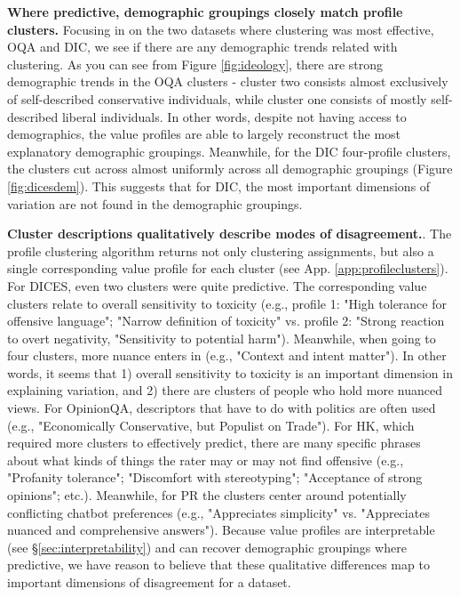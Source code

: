 \documentclass[11pt]{article}
\begin{document}
\textbf{Where predictive, demographic groupings closely match profile clusters.}
Focusing in on the two datasets where clustering was most effective, OQA and DIC, we see if there are any demographic trends related with clustering. As you can see from Figure \ref{fig:ideology}, there are strong demographic trends in the OQA clusters - cluster two consists almost exclusively of self-described conservative individuals, while cluster one consists of mostly self-described liberal individuals. In other words, despite not having access to demographics, the value profiles are able to largely reconstruct the most explanatory demographic groupings. Meanwhile, for the DIC four-profile clusters, the clusters cut across almost uniformly across all demographic groupings (Figure \ref{fig:dicesdem}). This suggests that for DIC, the most important dimensions of variation are not found in the demographic groupings.

\textbf{Cluster descriptions qualitatively describe modes of disagreement.}.
The profile clustering algorithm returns not only clustering assignments, but also a single corresponding value profile for each cluster (see App. \ref{app:profileclusters}).
For DICES, even two clusters were quite predictive. The corresponding value clusters relate to overall sensitivity to toxicity (e.g., profile 1: "High tolerance for offensive language"; "Narrow definition of toxicity" vs. profile 2: "Strong reaction to overt negativity, "Sensitivity to potential harm"). Meanwhile, when going to four clusters, more nuance enters in (e.g., "Context and intent matter"). In other words, it seems that 1) overall sensitivity to toxicity is an important dimension in explaining variation, and 2) there are clusters of people who hold more nuanced views.
For OpinionQA, descriptors that have to do with politics are often used (e.g., "Economically Conservative, but Populist on Trade"). For HK, which required more clusters to effectively predict, there are many specific phrases about what kinds of things the rater may or may not find offensive (e.g., "Profanity tolerance"; "Discomfort with stereotyping"; "Acceptance of strong opinions"; etc.). Meanwhile, for PR the clusters center around potentially conflicting chatbot preferences (e.g., "Appreciates simplicity" vs. "Appreciates nuanced and comprehensive answers").
Because value profiles are interpretable (see \S \ref{sec:interpretability}) and can recover demographic groupings where predictive, we have reason to believe that these qualitative differences map to important dimensions of disagreement for a dataset.
\end{document}
